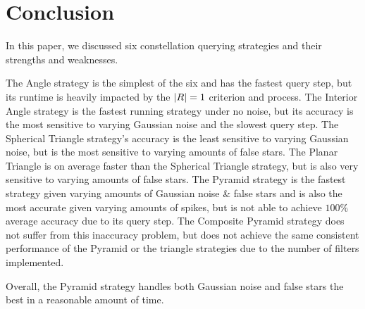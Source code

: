 \section{Conclusion}\label{sec:conclusion}
In this paper, we discussed six constellation querying strategies and their strengths and weaknesses.

The Angle strategy is the simplest of the six and has the fastest query step, but its runtime is heavily impacted by
the $\left| R \right| = 1$ criterion and  process.
The Interior Angle strategy is the fastest running strategy under no noise, but its accuracy is the most sensitive to
varying Gaussian noise and the slowest query step.
The Spherical Triangle strategy's accuracy is the least sensitive to varying Gaussian noise, but is the most sensitive
to varying amounts of false stars.
The Planar Triangle is on average faster than the Spherical Triangle strategy, but is also very sensitive to varying
amounts of false stars.
The Pyramid strategy is the fastest strategy given varying amounts of Gaussian noise \& false stars and is also the most
accurate given varying amounts of spikes, but is not able to achieve $100\%$ average accuracy due to its query step.
The Composite Pyramid strategy does not suffer from this inaccuracy problem, but does not achieve the same consistent
performance of the Pyramid or the triangle strategies due to the number of filters implemented.

Overall, the Pyramid strategy handles both Gaussian noise and false stars the best in a reasonable amount of time.
